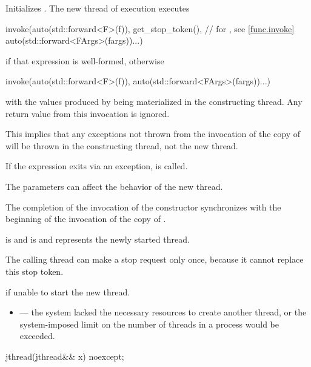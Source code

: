 \begin{itemdescr}
\pnum
\effects
Initializes .
The new thread of execution executes
\begin{codeblock}
invoke(auto(std::forward<F>(f)), get_stop_token(),  // for , see \ref{func.invoke}
       auto(std::forward<FArgs>(fargs))...)
\end{codeblock}
if that expression is well-formed,
otherwise
\begin{codeblock}
invoke(auto(std::forward<F>(f)), auto(std::forward<FArgs>(fargs))...)
\end{codeblock}
with the values produced by 
being materialized in the constructing thread.
Any return value from this invocation is ignored.
\begin{note}
This implies that any exceptions not thrown from the invocation of the copy
of  will be thrown in the constructing thread, not the new thread.
\end{note}
If the  expression exits via an exception,
 is called.
\begin{note}
The parameters 
can affect the behavior of the new thread.
\end{note}

\pnum
\sync
The completion of the invocation of the constructor
synchronizes with the beginning of the invocation of the copy of .

\pnum
\ensures
{} is 
and  is 
and  represents the newly started thread.
\begin{note}
The calling thread can make a stop request only once,
because it cannot replace this stop token.
\end{note}

\pnum
\throws
{} if unable to start the new thread.

\pnum
\errors
\begin{itemize}
\item {} --- the system lacked
the necessary resources to create another thread,
or the system-imposed limit on the number of threads in a process
would be exceeded.
\end{itemize}
\end{itemdescr}

%
\begin{itemdecl}
jthread(jthread&& x) noexcept;
\end{itemdecl}

